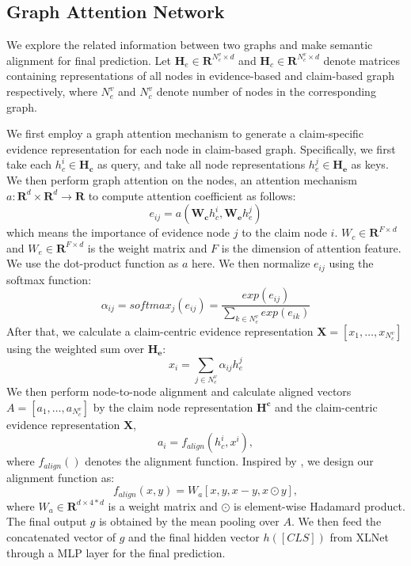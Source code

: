 \documentclass[11pt,a4paper]{article}
\begin{document}
\subsection{Graph Attention Network}
\label{sectin:graph-attention-net}
We explore the related information between two graphs and make semantic alignment for final prediction.
Let $\bm{H}_e \in \bm{R}^{N^v_e \times d}$ and $\bm{H}_c \in \bm{R}^{N^v_c \times d}$ denote matrices containing representations of all nodes in evidence-based and claim-based graph respectively, where $N^v_e$ and $N^v_c$ denote number of nodes in the corresponding graph. 
\par
We first employ a graph attention mechanism \cite{velivckovic2017graph} to generate a claim-specific evidence representation for each node in claim-based graph. Specifically, we first take each $h^i_c \in\bm{H_c}$ as query, and take all node representations $h^j_e \in \bm{H_e}$ as keys. 
We then perform graph attention on the nodes, an attention mechanism 
$a: \bm{R}^d \times \bm{R}^d \rightarrow \bm{R}$ to compute attention coefficient as follows:
\begin{equation}
e_{ij} = a(\bm{W_c}h^i_c,\bm{W_e}h^j_e)
\end{equation} 
which means the importance of evidence node $j$ to the claim node $i$. 
$W_c\in \bm{R}^{F\times d}$ and $W_e\in \bm{R}^{F\times d}$ is the weight matrix and $F$ is the dimension of attention feature. 
We use the dot-product function as $a$ here.
We then normalize $e_{ij}$ using the softmax function:
\begin{equation}
\alpha_{ij} = softmax_j(e_{ij}) = \frac{exp(e_{ij})}{\sum_{k\in N^v_e} exp(e_{ik})}
\end{equation}
After that, we calculate a claim-centric evidence representation $\bm{X} = [x_1,\dots,x_{N^v_c}]$ using the weighted sum over $\bm{H_e}$:
\begin{equation}
x_i = \sum_{j\in N^v_e}\alpha_{ij}h^j_e
\end{equation}
We then perform node-to-node alignment and calculate aligned vectors $A=[a_1,\dots, a_{N_c^v}]$ by the claim node representation $\bm{H^c}$ and the claim-centric evidence representation $\bm{X}$,
\begin{equation}
a_{i} = f_{align}(h_c^i,x^i),
\end{equation}
where $f_{align}()$ denotes the alignment function. Inspired by , we design our alignment function as:
\begin{equation}
f_{align}(x, y) = W_a[x,y,x-y,x\odot y],
\end{equation}
where $W_a \in \bm{R}^{d \times 4*d}$ is a weight matrix and $\odot$ is element-wise Hadamard product. 
The final output $g$ is obtained by the mean pooling over $A$. 
We then feed the concatenated vector of $g$ and the final hidden vector $h([CLS])$ from XLNet through a MLP layer for the final prediction.
\end{document}
